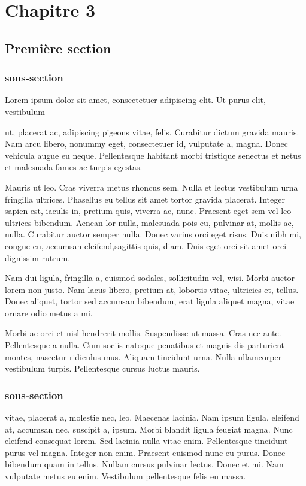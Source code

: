 \chapter{Chapitre 3}
\section{Première section}
\subsection{sous-section}
Lorem ipsum dolor sit amet, consectetuer adipiscing elit. Ut purus elit, vestibulum

ut, placerat ac, adipiscing \Glspl{pigeon} vitae, felis. Curabitur dictum gravida mauris. Nam arcu libero,
nonummy eget, consectetuer id, vulputate a, magna. Donec vehicula augue eu neque. Pellentesque
habitant morbi tristique senectus et netus et malesuada fames ac turpis egestas.

Mauris ut leo. Cras viverra metus rhoncus sem. Nulla et lectus vestibulum urna fringilla
ultrices. Phasellus eu tellus sit amet tortor gravida placerat. Integer sapien est, iaculis
in, pretium quis, viverra ac, nunc. Praesent eget sem vel leo ultrices bibendum. Aenean
lor nulla, malesuada \Gls{pois} eu, pulvinar at, mollis ac, nulla. Curabitur auctor
semper nulla. Donec varius orci eget risus. Duis nibh mi, congue eu, accumsan eleifend,sagittis quis, diam. Duis eget orci sit amet orci dignissim rutrum.

Nam dui ligula, fringilla a, euismod sodales, sollicitudin vel, wisi. Morbi auctor lorem
non justo. Nam lacus libero, pretium at, lobortis vitae, ultricies et, tellus. Donec aliquet,
tortor sed accumsan bibendum, erat ligula aliquet magna, vitae ornare odio metus a mi.

Morbi ac orci et nisl hendrerit mollis. Suspendisse ut massa. Cras nec ante. Pellentesque
a nulla. Cum sociis natoque penatibus et magnis dis parturient montes, nascetur ridiculus
mus. Aliquam tincidunt urna. Nulla ullamcorper vestibulum turpis. Pellentesque cursus
luctus mauris.



\subsection{sous-section}
vitae, placerat a, molestie nec, leo. Maecenas lacinia. Nam ipsum ligula, eleifend at, accumsan
nec, suscipit a, ipsum. Morbi blandit ligula feugiat magna. Nunc eleifend consequat
lorem. Sed lacinia nulla vitae enim. Pellentesque tincidunt purus vel magna. Integer non
enim. Praesent euismod nunc eu purus. Donec bibendum quam in tellus. Nullam cursus
pulvinar lectus. Donec et mi. Nam vulputate metus eu enim. Vestibulum pellentesque felis eu massa.
